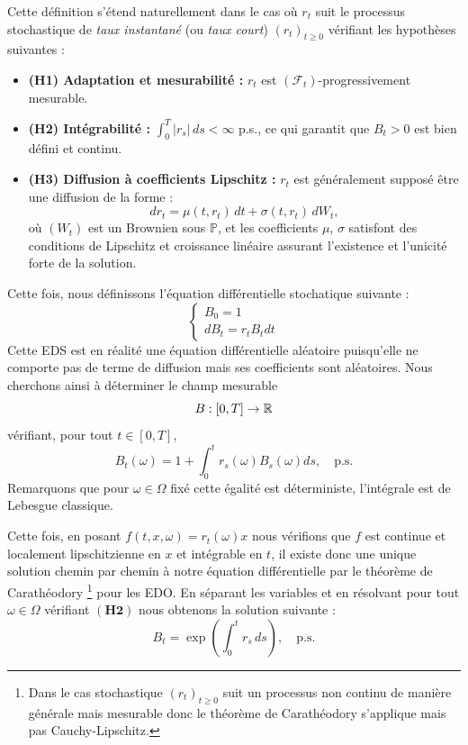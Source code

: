 Cette définition s'étend naturellement dans le cas où $r_t$ suit le processus stochastique
de \emph{taux instantané} (ou \emph{taux court}) $(r_t)_{t \ge 0}$ vérifiant les hypothèses suivantes :

\begin{itemize}
    \item \textbf{(H1) Adaptation et mesurabilité :}
    $r_t$ est $(\mathcal{F}_t)$-progressivement mesurable.
    \item \textbf{(H2) Intégrabilité :}
    $\displaystyle \int_0^T |r_s|\,ds < \infty$ p.s., ce qui garantit que 
    $B_t>0$ est bien défini et continu.
    \item \textbf{(H3) Diffusion à coefficients Lipschitz :}
    $r_t$ est généralement supposé être une diffusion de la forme :
    \begin{equation}
        dr_t = \mu(t,r_t)\,dt + \sigma(t,r_t)\,dW_t,
    \end{equation}
    où $(W_t)$ est un Brownien sous $\mathbb{P}$, et les coefficients
    $\mu$, $\sigma$ satisfont des conditions de Lipschitz et croissance linéaire
    assurant l'existence et l'unicité forte de la solution.
\end{itemize}

\noindent Cette fois, nous définissons l'équation différentielle stochatique suivante :
\begin{equation}
    \begin{cases}
        B_0 = 1 \\
        dB_t = r_t B_t dt
    \end{cases}
\end{equation}
Cette EDS est en réalité une équation différentielle aléatoire puisqu'elle
ne comporte pas de terme de diffusion mais ses coefficients sont aléatoires. Nous cherchons
ainsi à déterminer le champ mesurable 
\begin{equation}
    B : [0, T] \time \Omega \to \mathbb{R}
\end{equation}
vérifiant, pour tout $t \in [0, T]$,
\begin{equation}
    B_t(\omega) = 1 + \int_0^t r_s(\omega)B_s(\omega) ds, \quad \text{p.s.}
\end{equation}
Remarquons que pour $\omega \in \Omega$ fixé cette égalité est
déterministe, l'intégrale est de Lebesgue classique.

Cette fois, en posant $f(t, x, \omega) = r_t(\omega) x$ nous vérifions
que $f$ est continue et localement lipschitzienne en $x$ et intégrable en $t$,
il existe donc une unique solution chemin par chemin à notre équation différentielle par le
théorème de Carathéodory \footnote{Dans le cas stochastique $(r_t)_{t\ge0}$ suit un processus non continu de manière
générale mais mesurable donc le théorème de Carathéodory s'applique mais pas Cauchy-Lipschitz.} pour les EDO. 
En séparant les variables et en résolvant pour tout $\omega \in \Omega$ vérifiant $\mathbf{(H2)}$
nous obtenons la solution suivante :
\begin{equation}
    B_t = \exp\!\left(\int_0^t r_s \, ds\right), \quad \text{p.s.}
\end{equation}


